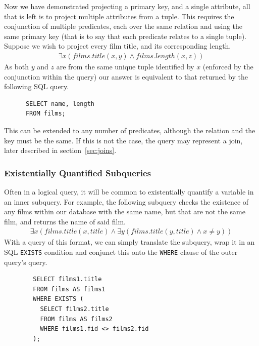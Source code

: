 \documentclass[a4paper, 11pt]{article}
\begin{document}
      Now we have demonstrated projecting a primary key, and a single attribute,
      all that is left is to project multiple attributes from a tuple. This
      requires the conjunction of multiple predicates, each over the same relation
      and using the same primary key (that is to say that each predicate relates
      to a single tuple). Suppose we wish to project every film title, and its
      corresponding length.
      \begin{gather}
        \exists x(films.title(x, y) \land films.length(x, z))
      \end{gather}
      As both $y$ and $z$ are from the same unique tuple identified by $x$
      (enforced by the conjunction within the query) our
      answer is equivalent to that returned by the following SQL query.
      \begin{verbatim}
      SELECT name, length
      FROM films;
      \end{verbatim}
      This can be extended to any number of predicates, although the relation and
      the key must be the same. If this is not the case, the query may represent
      a join, later described in section~\ref{sec:joins}.

    \subsubsection{Existentially Quantified Subqueries}
      \label{sec:existential}
      Often in a logical query, it will be common to existentially quantify a
      variable in an inner subquery. For example, the following subquery checks
      the existence of any films within our database with the same name, but that
      are not the same film, and returns the name of said film.
      \begin{gather}
        \exists x(films.title(x, title) \land \exists y(films.title(y,
        title) \land x \neq y))
      \end{gather}
      With a query of this format, we can simply translate the subquery, wrap it
      in an SQL \texttt{EXISTS} condition and conjunct this onto the
      \texttt{WHERE} clause of the outer query's query.

      \begin{verbatim}
        SELECT films1.title
        FROM films AS films1
        WHERE EXISTS (
          SELECT films2.title
          FROM films AS films2
          WHERE films1.fid <> films2.fid
        );
      \end{verbatim}
\end{document}
